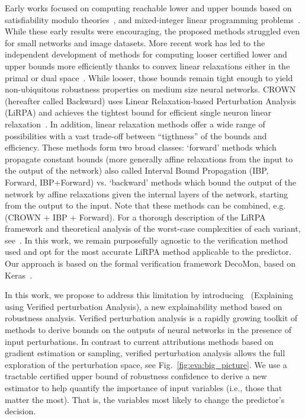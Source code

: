 Early works focused on computing reachable lower and upper bounds based on satisfiability modulo theories~\cite{katz2017reluplex, ehlers2017formal}, and mixed-integer linear programming problems~\cite{tjeng2017verifying}. While these early results were encouraging, the proposed methods struggled even for small networks and image datasets. More recent work has led to the independent development of methods for computing looser certified lower and upper bounds more efficiently thanks to convex linear relaxations either in the primal or dual space~\cite{salman2019convex}. 
While looser, those bounds remain tight enough to yield non-ubiquitous robustness properties on medium size neural networks. CROWN (hereafter called Backward) uses Linear Relaxation-based Perturbation Analysis (LiRPA) and achieves the tightest bound for efficient single neuron linear relaxation~\cite{zhang2018efficient, singh2019abstract, wang2021beta}. 
In addition, linear relaxation methods offer a wide range of possibilities with a vast trade-off between ``tigthness'' of the bounds and efficiency. 
These methods form two broad classes: `forward' methods which propagate constant bounds (more generally affine relaxations from the input to the output of the network) also called Interval Bound Propagation (IBP, Forward, IBP+Forward) vs. `backward' methods which bound the output of the network by affine relaxations given the internal layers of the network, starting from the output to the input. Note that these methods can be combined, e.g. (CROWN + IBP + Forward).
For a thorough description of the LiRPA framework and theoretical analysis of the worst-case complexities of each variant, see~\cite{xu2020automatic}.
In this work, we remain purposefully agnostic to the verification method used and opt for the most accurate LiRPA method applicable to the predictor. Our approach is based on the formal verification framework DecoMon, based on Keras~\cite{ducoffe2021decomon}.


In this work, we propose to address this limitation by introducing \eva~(Explaining using Verified perturbation Analysis), a new explainability method based on robustness analysis. Verified perturbation analysis is a rapidly growing toolkit of methods to derive bounds on the outputs of neural networks in the presence of input perturbations. In contrast to current attributions methods based on gradient estimation or sampling, verified perturbation analysis allows the full exploration of the perturbation space, see Fig.~\ref{fig:eva:big_picture}. We use a tractable certified upper bound of robustness confidence to derive a new estimator to help quantify the importance of input variables (i.e., those that matter the most). That is, the variables most likely to change the predictor's decision.



